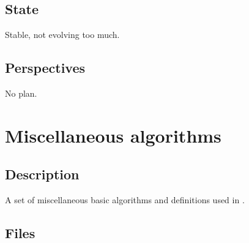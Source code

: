 \documentclass[a4paper,11pt,english]{sphinxmanual}
\begin{document}
\subsection{State}
\label{\detokenize{project/libdesc_dal:state}}
Stable, not evolving too much.


\subsection{Perspectives}
\label{\detokenize{project/libdesc_dal:perspectives}}
No plan.


\section{Miscellaneous algorithms}
\label{\detokenize{project/libdesc_misc:miscellaneous-algorithms}}\label{\detokenize{project/libdesc_misc:dp-libdesc-misc}}\label{\detokenize{project/libdesc_misc::doc}}

\subsection{Description}
\label{\detokenize{project/libdesc_misc:description}}
A set of miscellaneous basic algorithms and definitions used in .


\subsection{Files}
\label{\detokenize{project/libdesc_misc:files}}
\end{document}

